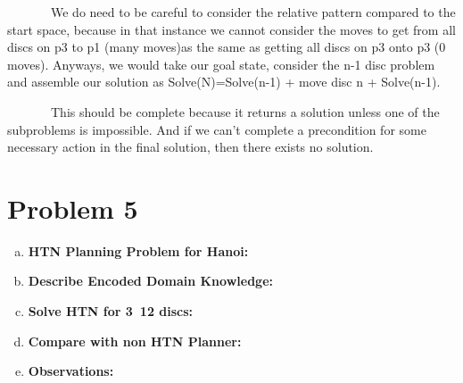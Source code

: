 \documentclass[]{article}
\begin{document}
\begin{enumerate}[(a)]
		~~~~~~~We do need to be careful to consider the relative pattern compared to the start space, because in that instance we cannot consider the moves to get from all discs on p3  to p1 (many moves)as the same as getting all discs on p3 onto p3 (0 moves). Anyways, we would take our goal state, consider the n-1 disc problem and assemble our solution as Solve(N)=Solve(n-1) + move disc n + Solve(n-1). 
		
		~~~~~~~This should be complete because it returns a solution unless one of the subproblems is impossible. And if we can't complete a precondition for some necessary action in the final solution, then there exists no solution.
			
	\end{enumerate}
	
\section{Problem 5}
	\begin{enumerate}[(a)]
		\item \textbf{HTN Planning Problem for Hanoi:}\\
		\item \textbf{Describe Encoded Domain Knowledge:}\\
		\item \textbf{Solve HTN for 3~12 discs:}\\
		\item \textbf{Compare with non HTN Planner:}\\
		\item \textbf{Observations:}\\
	\end{enumerate}
\end{document}
